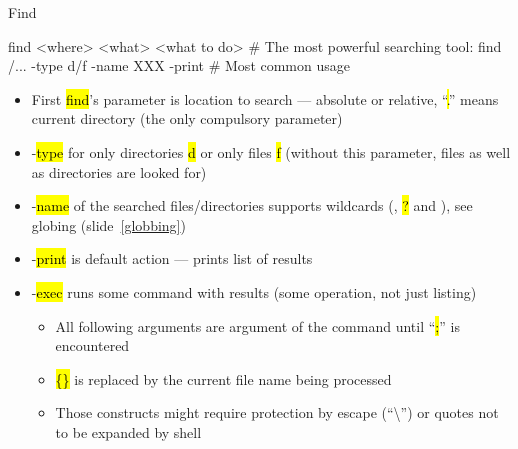 \documentclass[compress, ucs, xelatex, 11pt, xcolor=svgnames, aspectratio=169,
	hyperref={
		bookmarks=true,
		unicode=true,
		colorlinks=true,
		pdftitle={Linux, command line and MetaCentrum},
		plainpages=false,
		pdfauthor={Vojtech Zeisek},
		pdfsubject={Course about use of Linux command line, writing shell scripts and using MetaCentrum of CESNET},
		pdfcreator={XeLaTeX},
		pdfkeywords={Linux, GNU, BASH, shell, command line, MetaCentrum},
		linkcolor=DarkRed, %
		anchorcolor=DarkBlue, %
		citecolor=Indigo, %
		filecolor=NavyBlue, %
		menucolor=DarkMagenta, %
		urlcolor=DarkBlue, %
		pdftex},
	url={hyphens, lowtilde} %
	]{beamer}
\renewcommand{\texttt}[1]{\hl{\ttfamily #1}}
\begin{document}
\begin{frame}[fragile]{Find}
	\begin{bashcode}
    find <where> <what> <what to do> # The most powerful searching tool:
    find /... -type d/f -name XXX -print # Most common usage
	\end{bashcode}
	\begin{itemize}
		\item First \texttt{find}'s parameter is location to search --- absolute or relative, \enquote{\texttt{.}} means current directory (the only compulsory parameter)
		\item -\texttt{type} for only directories \texttt{d} or only files \texttt{f} (without this parameter, files as well as directories are looked for)
		\item -\texttt{name} of the searched files/directories supports wildcards (\texttt{*}, \texttt{?} and \texttt{[\ldots]}), see globing (slide~\ref{globbing})
		\item -\texttt{print} is default action --- prints list of results
		\item -\texttt{exec} runs some command with results (some operation, not just listing)
		\begin{itemize}
			\item All following arguments are argument of the command until \enquote{\texttt{;}} is encountered
			\item \texttt{\{\}} is replaced by the current file name being processed
			\item Those constructs might require protection by escape (\enquote{\textbackslash}) or quotes not to be expanded by shell
		\end{itemize}
	\end{itemize}
\end{frame}
\end{document}
